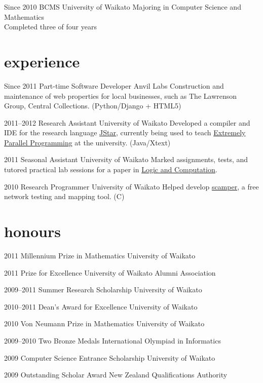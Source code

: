 \documentclass[11pt]{boris-cv}
\begin{document}
\begin{entrylist}
  \entry
    {Since 2010}
    {BCMS }
    {University of Waikato}
    {Majoring in Computer Science and Mathematics\\Completed three of four years}
\end{entrylist}

\section{experience}

\begin{entrylist}
  \entry
    {Since 2011}
    {Part-time Software Developer}
    {Anvil Labs}
    {Construction and maintenance of web properties for local businesses,
		such as The Lawrenson Group, Central Collections. (Python/Django + HTML5)}

  \entry
    {2011--2012}
    {Research Assistant}
    {University of Waikato}
    {Developed a compiler and IDE for the research language
    \href{http://www.cs.waikato.ac.nz/research/jstar/}{JStar}, currently being used to teach
    \href{http://papers.waikato.ac.nz/subjects/COMP/COMP553}
    {Extremely Parallel Programming} at the university. (Java/Xtext)}

  \entry
    {2011}
    {Seasonal Assistant}
    {University of Waikato}
    {Marked assignments, tests, and tutored
    practical lab sessions for a paper in 
    \href{http://papers.waikato.ac.nz/subjects/COMP/COMP235}
    {Logic and Computation}.}

  \entry
    {2010}
    {Research Programmer}
    {University of Waikato}
    {Helped develop
    \href{http://www.wand.net.nz/scamper}{scamper},
    a free network testing and mapping tool. (C)}
\end{entrylist}

\pagebreak

\section{honours}
\begin{entrylist}
  \titleentry
    {2011}
    {Millennium Prize in Mathematics}
    {University of Waikato}

  \titleentry
    {2011}
    {Prize for Excellence}
    {University of Waikato Alumni Association}

  \titleentry
    {2009--2011}
    {Summer Research Scholarship}
    {University of Waikato}

  \titleentry
    {2010--2011}
    {Dean's Award for Excellence}
    {University of Waikato}

  \titleentry
    {2010}
    {Von Neumann Prize in Mathematics}
    {University of Waikato}

  \titleentry
    {2009--2010}
    {Two Bronze Medals}
    {International Olympiad in Informatics}

  \titleentry
    {2009}
    {Computer Science Entrance Scholarship}
    {University of Waikato}

  \titleentry
    {2009}
    {Outstanding Scholar Award}
    {New Zealand Qualifications Authority}
\end{entrylist}
\end{document}
